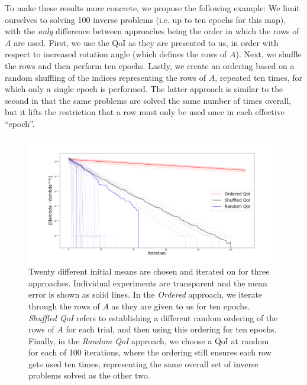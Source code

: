 To make these results more concrete, we propose the following example:
We limit ourselves to solving 100 inverse problems (i.e. up to ten epochs for this map), with the \emph{only} difference between approaches being the order in which the rows of $A$ are used.
First, we use the QoI as they are presented to us, in order with respect to increased rotation angle (which defines the rows of $A$).
Next, we shuffle the rows and then perform ten epochs.
Lastly, we create an ordering based on a random shuffling of the indices representing the rows of $A$, repeated ten times, for which only a single epoch is performed.
The latter approach is similar to the second in that the same problems are solved the same number of times overall, but it lifts the restriction that a row must only be used once in each effective ``epoch''.

\begin{figure}
  \centering
  \includegraphics[width=0.95\linewidth]{examples/iterative/10D-convergence-comparison}
  \caption{
  Twenty different initial means are chosen and iterated on for three approaches.
  Individual experiments are transparent and the mean error is shown as solid lines.
  In the \emph{Ordered} approach, we iterate through the rows of $A$ as they are given to us for ten epochs.
  \emph{Shuffled QoI} refers to establishing a different random ordering of the rows of $A$ for each trial, and then
  using this ordering for ten epochs.
  Finally, in the \emph{Random QoI} approach, we choose a QoI at random for each of 100 iterations, where the ordering still ensures each row gets used ten times, representing the same overall set of inverse problems solved as the other two.
  }
  \label{fig:iterative-convergence-comparison}
\end{figure}

